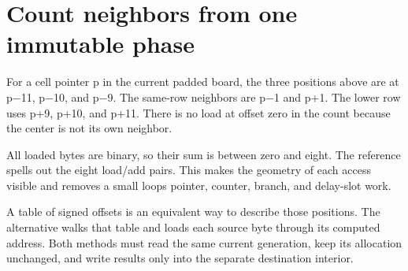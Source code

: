 \section{Count neighbors from one immutable
  phase}\label{008-life-generations-p06-count-neighbors-from-one-immutable-phase}

For a cell pointer p in the current padded board, the three positions
above are at p\ensuremath{-}11, p\ensuremath{-}10, and p\ensuremath{-}9. The same-row neighbors are p\ensuremath{-}1 and
p+1. The lower row uses p+9, p+10, and p+11. There is no load at offset
zero in the count because the center is not its own neighbor.

All loaded bytes are binary, so their sum is between zero and eight. The
reference spells out the eight load/add pairs. This makes the geometry
of each access visible and removes a small loop\textquotesingle s
pointer, counter, branch, and delay-slot work.

A table of signed offsets is an equivalent way to describe those
positions. The alternative walks that table and loads each source byte
through its computed address. Both methods must read the same current
generation, keep its allocation unchanged, and write results only into
the separate destination interior.
